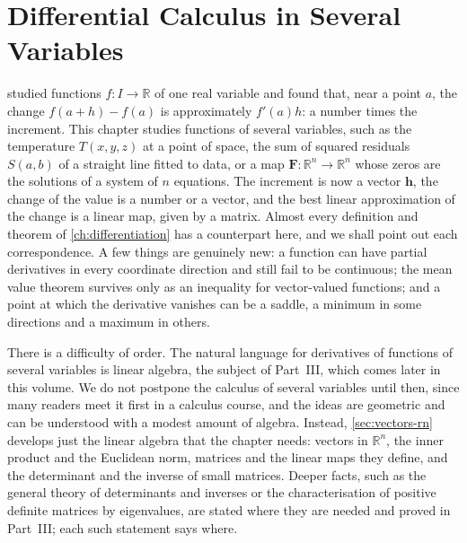 \chapter{Differential Calculus in Several Variables}
\label{ch:several-variables}


 studied functions $f\colon I\to\mathbb R$ of one real variable and found that, near a point $a$, the change $f(a+h)-f(a)$ is approximately $f'(a)h$: a number times the increment. This chapter studies functions of several variables, such as the temperature $T(x,y,z)$ at a point of space, the sum of squared residuals $S(a,b)$ of a straight line fitted to data, or a map $\mathbf F\colon\mathbb R^n\to\mathbb R^n$ whose zeros are the solutions of a system of $n$ equations. The increment is now a vector $\mathbf h$, the change of the value is a number or a vector, and the best linear approximation of the change is a linear map, given by a matrix. Almost every definition and theorem of \cref{ch:differentiation} has a counterpart here, and we shall point out each correspondence. A few things are genuinely new: a function can have partial derivatives in every coordinate direction and still fail to be continuous; the mean value theorem survives only as an inequality for vector-valued functions; and a point at which the derivative vanishes can be a saddle, a minimum in some directions and a maximum in others.

There is a difficulty of order. The natural language for derivatives of functions of several variables is linear algebra, the subject of Part~III, which comes later in this volume. We do not postpone the calculus of several variables until then, since many readers meet it first in a calculus course, and the ideas are geometric and can be understood with a modest amount of algebra. Instead, \cref{sec:vectors-rn} develops just the linear algebra that the chapter needs: vectors in $\mathbb R^n$, the inner product and the Euclidean norm, matrices and the linear maps they define, and the determinant and the inverse of small matrices. Deeper facts, such as the general theory of determinants and inverses or the characterisation of positive definite matrices by eigenvalues, are stated where they are needed and proved in Part~III; each such statement says where.

